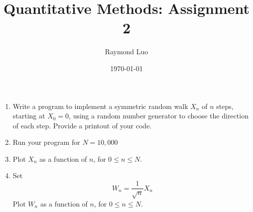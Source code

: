 \documentclass[12pt,twoside, letter]{exam}
\theoremstyle{definition}
\begin{document}
\abovedisplayskip=12pt
\belowdisplayskip=12pt
\abovedisplayshortskip=7pt
\belowdisplayshortskip=10pt
\allowdisplaybreaks

\setlength{\parindent}{18pt}

\title{Quantitative Methods: Assignment 2}
\author{Raymond Luo}
\date{\today}
\maketitle

\begin{enumerate}
  \item Write a program to implement a symmetric random walk $X_{n}$ of $n$ steps, starting at $X_0 = 0$, using a random number generator to choose the
    direction of each step. Provide a printout of your code.
  \item Run your program for $N = 10,000$
  \item Plot $X_n$ as a function of $n$, for $0 \leq n \leq N$.
  \item Set
    \begin{equation*}
      W_{n} = \frac{1}{\sqrt{n}} X_{n}
    \end{equation*}
    Plot $W_n$ as a function of $n$, for $0 \leq n \leq N$.
\end{enumerate}
\end{document}
